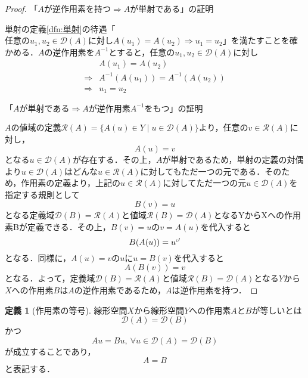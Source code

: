 \documentclass[11pt,a4paper,titlepage]{jsreport}
\theoremstyle{definition}
\newtheorem{dfn}{定義}
\begin{document}
\begin{proof}
  「$Aが逆作用素を持つ \Rightarrow Aが単射である$」の証明

  単射の定義\ref{dfn:単射}の待遇「$任意のu_1,u_2\in\mathcal{D}(A)に対しA(u_1)=A(u_2) \Rightarrow u_1=u_2$」を満たすことを確かめる．$A$の逆作用素を$A^{-1}$とすると，任意の$u_1,u_2\in\mathcal{D}(A)$に対し
  \begin{align*}
                & A(u_1) = A(u_2)               \\
    \Rightarrow & A^{-1}(A(u_1))=A^{-1}(A(u_2)) \\
    \Rightarrow & u_1=u_2
  \end{align*}

  $「Aが単射である\Rightarrow Aが逆作用素A^{-1}をもつ」の証明$

  $A$の値域の定義$\mathcal{R}(A)=\{A(u)\in Y \mid u\in\mathcal{D}(A)\}$より，任意の$v\in\mathcal{R}(A)$に対し，
  \begin{equation*}
    A(u)=v
  \end{equation*}
  となる$u\in\mathcal{D}(A)$が存在する．その上，$A$が単射であるため，単射の定義の対偶より$u\in\mathcal{D}(A)$はどんな$u\in\mathcal{R}(A)$に対してもただ一つの元である．そのため，作用素の定義より，上記の$u\in\mathcal{R}(A)$に対してただ一つの元$u\in\mathcal{D}(A)$を指定する規則として
  \begin{equation*}
    B(v)=u
  \end{equation*}
  となる定義域$\mathcal{D}(B)=\mathcal{R}(A)$と値域$\mathcal{R}(B)=\mathcal{D}(A)$となるYからXへの作用素Bが定義できる．その上，$B(v)=u$の$v=A(u)$を代入すると
  \begin{equation*}
    B(A(u))=u`'
  \end{equation*}
  となる．同様に，$A(u)=v$の$u$に$u=B(v)$を代入すると
  \begin{equation*}
    A(B(v))=v
  \end{equation*}
  となる．よって，定義域$\mathcal{D}(B)=\mathcal{R}(A)$と値域$\mathcal{R}(B)=\mathcal{D}(A)$となる$Y$から$X$への作用素$B$は$A$の逆作用素であるため，$A$は逆作用素を持つ．
\end{proof}

\begin{dfn}[作用素の等号]
  線形空間$X$から線形空間$Y$への作用素$A$と$B$が等しいとは
  \begin{equation*}
    \mathcal{D}(A) = \mathcal{D}(B)
  \end{equation*}
  かつ
  \begin{equation*}
    Au=Bu, \  \forall u\in\mathcal{D}(A)=\mathcal{D}(B)
  \end{equation*}
  が成立することであり，
  \begin{equation*}
    A=B
  \end{equation*}
  と表記する．
\end{dfn}
\end{document}
